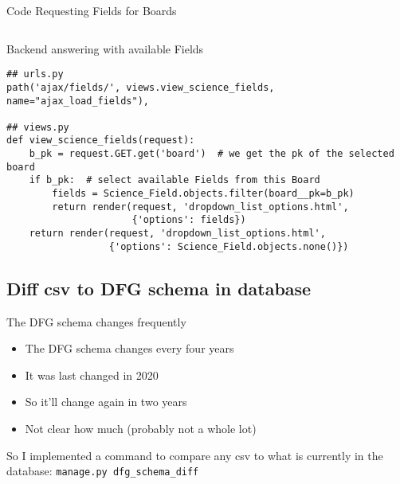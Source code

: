 \begin{frame}[c,fragile]{Code Requesting Fields for Boards}
    \footnotesize
    \inputminted[linenos=true]{javascript}{code/board_request.js}
\end{frame}


\begin{frame}[c,fragile]{Backend answering with available Fields}
\footnotesize
    \begin{verbatim}
## urls.py
path('ajax/fields/', views.view_science_fields, name="ajax_load_fields"),

## views.py
def view_science_fields(request):
    b_pk = request.GET.get('board')  # we get the pk of the selected board
    if b_pk:  # select available Fields from this Board
        fields = Science_Field.objects.filter(board__pk=b_pk) 
        return render(request, 'dropdown_list_options.html',
                      {'options': fields})
    return render(request, 'dropdown_list_options.html',
                  {'options': Science_Field.objects.none()})
\end{verbatim}
\end{frame}

\subsection{Diff csv to DFG schema in database}

\begin{frame}[c]{The DFG schema changes frequently}
    \large
    \begin{itemize}[<+(1)->]
        \item The DFG schema changes every four years
        \item It was last changed in 2020
        \item So it'll change again in two years
        \item Not clear how much (probably not a whole lot)
    \end{itemize}
    \pause
    So I implemented a command to compare any csv to what is currently in the
    database: \texttt{manage.py dfg_schema_diff}
\end{frame}


